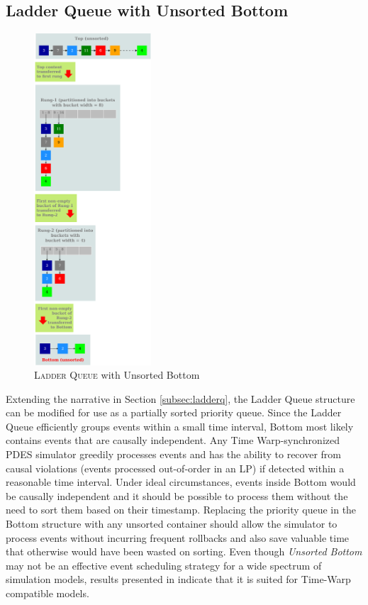 \documentclass[11pt]{book}
\begin{document}
\subsection{Ladder Queue with Unsorted Bottom}\label{subsec:unsorted_bottom}

\begin{figure}
    \centerline{\includegraphics[width=0.39\textwidth]{figures/ladderq_unsorted_bottom}}
    \caption{\textsc{Ladder Queue} with Unsorted Bottom}
    \label{fig:unsorted_bottom}
\end{figure}

Extending the narrative in Section \ref{subsec:ladderq}, the Ladder Queue \cite{tang-05} structure can be
modified for use as a partially sorted priority queue. Since the Ladder Queue efficiently groups events within
a small time interval, Bottom most likely contains events that are causally independent.  Any Time
Warp-synchronized PDES simulator greedily processes events and has the ability to recover from causal
violations (events processed out-of-order in an LP) if detected within a reasonable time interval.  Under
ideal circumstances, events inside Bottom would be causally independent and it should be possible to process
them without the need to sort them based on their timestamp.  Replacing the priority queue in the Bottom
structure with any unsorted container should allow the simulator to process events without incurring frequent
rollbacks and also save valuable time that otherwise would have been wasted on sorting. Even though
\emph{Unsorted Bottom} may not be an effective event scheduling strategy for a wide spectrum of simulation
models, results presented in \cite{gupta-14} indicate that it is suited for Time-Warp compatible models.
\end{document}
